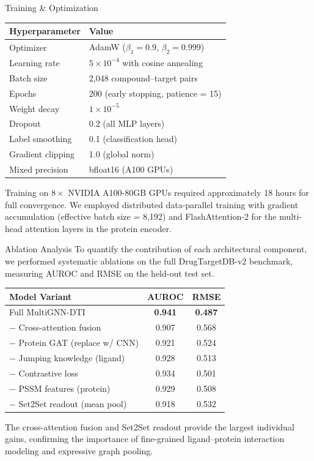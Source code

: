 \documentclass[20pt,landscape]{extarticle}
\begin{document}
\begin{minipage}[t]{0.325\textwidth}
\begin{posterblockteal}{Training \& Optimization}
\begin{tabularx}{\linewidth}{@{}lX@{}}
\toprule
\rule{0pt}{14pt}\textbf{Hyperparameter} & \textbf{Value} \\
\midrule
Optimizer & AdamW ($\beta_1 = 0.9$, $\beta_2 = 0.999$) \\
Learning rate & $5 \times 10^{-4}$ with cosine annealing \\
Batch size & 2,048 compound--target pairs \\
Epochs & 200 (early stopping, patience = 15) \\
Weight decay & $1 \times 10^{-5}$ \\
Dropout & 0.2 (all MLP layers) \\
Label smoothing & 0.1 (classification head) \\
Gradient clipping & 1.0 (global norm) \\
Mixed precision & bfloat16 (A100 GPUs) \\
\bottomrule
\end{tabularx}

\vspace{8pt}
Training on $8 \times$ NVIDIA A100-80GB GPUs required approximately 18 hours for full convergence.
We employed distributed data-parallel training with gradient accumulation (effective batch size = 8,192)
and FlashAttention-2 for the multi-head attention layers in the protein encoder.
\end{posterblockteal}

\begin{posterblock}{Ablation Analysis}
To quantify the contribution of each architectural component, we performed systematic ablations
on the full DrugTargetDB-v2 benchmark, measuring AUROC and RMSE on the held-out test set.

\begin{tabularx}{\linewidth}{@{}lcc@{}}
\toprule
\rule{0pt}{14pt}\textbf{Model Variant} & \textbf{AUROC} & \textbf{RMSE} \\
\midrule
Full MultiGNN-DTI & \textbf{0.941} & \textbf{0.487} \\
\rule{0pt}{12pt}$-$ Cross-attention fusion & 0.907 & 0.568 \\
$-$ Protein GAT (replace w/ CNN) & 0.921 & 0.524 \\
$-$ Jumping knowledge (ligand) & 0.928 & 0.513 \\
$-$ Contrastive loss & 0.934 & 0.501 \\
$-$ PSSM features (protein) & 0.929 & 0.508 \\
$-$ Set2Set readout (mean pool) & 0.918 & 0.532 \\
\bottomrule
\end{tabularx}

\vspace{8pt}
The cross-attention fusion and Set2Set readout provide the largest individual gains, confirming
the importance of fine-grained ligand--protein interaction modeling and expressive graph pooling.
\end{posterblock}

\end{minipage}%
\end{document}
